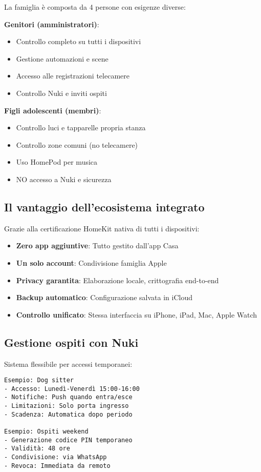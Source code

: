 La famiglia è composta da 4 persone con esigenze diverse:

\textbf{Genitori (amministratori)}:
\begin{itemize}
    \item Controllo completo su tutti i dispositivi
    \item Gestione automazioni e scene
    \item Accesso alle registrazioni telecamere
    \item Controllo Nuki e inviti ospiti
\end{itemize}

\textbf{Figli adolescenti (membri)}:
\begin{itemize}
    \item Controllo luci e tapparelle propria stanza
    \item Controllo zone comuni (no telecamere)
    \item Uso HomePod per musica
    \item NO accesso a Nuki e sicurezza
\end{itemize}

\subsection{Il vantaggio dell'ecosistema integrato}

Grazie alla certificazione HomeKit nativa di tutti i dispositivi:

\begin{itemize}
    \item \textbf{Zero app aggiuntive}: Tutto gestito dall'app Casa
    \item \textbf{Un solo account}: Condivisione famiglia Apple
    \item \textbf{Privacy garantita}: Elaborazione locale, crittografia end-to-end
    \item \textbf{Backup automatico}: Configurazione salvata in iCloud
    \item \textbf{Controllo unificato}: Stessa interfaccia su iPhone, iPad, Mac, Apple Watch
\end{itemize}

\subsection{Gestione ospiti con Nuki}

Sistema flessibile per accessi temporanei:

\begin{verbatim}
Esempio: Dog sitter
- Accesso: Lunedì-Venerdì 15:00-16:00
- Notifiche: Push quando entra/esce
- Limitazioni: Solo porta ingresso
- Scadenza: Automatica dopo periodo

Esempio: Ospiti weekend
- Generazione codice PIN temporaneo
- Validità: 48 ore
- Condivisione: via WhatsApp
- Revoca: Immediata da remoto
\end{verbatim}

